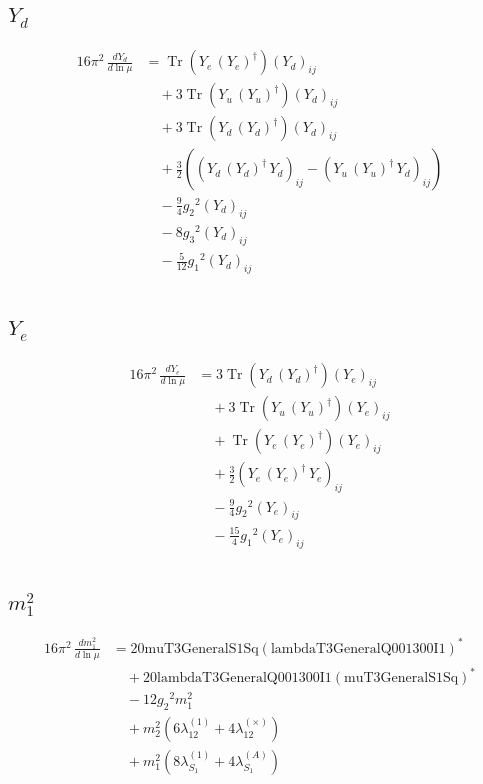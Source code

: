 \documentclass[10pt,a4paper]{article}
\begin{document}
\subsection*{$Y_d$}
\begin{align*}
16\pi^2\,\frac{d Y_d}{d\ln\mu} &=\operatorname{Tr}\!\left({Y_e}\,\left({Y_e}\right)^{\dagger}\right) \left({Y_d}\right)_{ij} \\
&\quad +3 \operatorname{Tr}\!\left({Y_u}\,\left({Y_u}\right)^{\dagger}\right) \left({Y_d}\right)_{ij} \\
&\quad +3 \operatorname{Tr}\!\left({Y_d}\,\left({Y_d}\right)^{\dagger}\right) \left({Y_d}\right)_{ij} \\
&\quad +\frac{3}{2} (\left({Y_d}\,\left({Y_d}\right)^{\dagger}\,{Y_d}\right)_{ij}-\left({Y_u}\,\left({Y_u}\right)^{\dagger}\,{Y_d}\right)_{ij}) \\
&\quad -\frac{9}{4} {g_2}^2 \left({Y_d}\right)_{ij} \\
&\quad -8 {g_3}^2 \left({Y_d}\right)_{ij} \\
&\quad -\frac{5}{12} {g_1}^2 \left({Y_d}\right)_{ij} \\
\end{align*}
\subsection*{$Y_e$}
\begin{align*}
16\pi^2\,\frac{d Y_e}{d\ln\mu} &=3 \operatorname{Tr}\!\left({Y_d}\,\left({Y_d}\right)^{\dagger}\right) \left({Y_e}\right)_{ij} \\
&\quad +3 \operatorname{Tr}\!\left({Y_u}\,\left({Y_u}\right)^{\dagger}\right) \left({Y_e}\right)_{ij} \\
&\quad +\operatorname{Tr}\!\left({Y_e}\,\left({Y_e}\right)^{\dagger}\right) \left({Y_e}\right)_{ij} \\
&\quad +\frac{3}{2} \left({Y_e}\,\left({Y_e}\right)^{\dagger}\,{Y_e}\right)_{ij} \\
&\quad -\frac{9}{4} {g_2}^2 \left({Y_e}\right)_{ij} \\
&\quad -\frac{15}{4} {g_1}^2 \left({Y_e}\right)_{ij} \\
\end{align*}
\subsection*{$m_1^2$}
\begin{align*}
16\pi^2\,\frac{d m_1^2}{d\ln\mu} &=20 \text{muT3GeneralS1Sq} \left(\text{lambdaT3GeneralQ001300I1}\right)^{*} \\
&\quad +20 \text{lambdaT3GeneralQ001300I1} \left(\text{muT3GeneralS1Sq}\right)^{*} \\
&\quad -12 {g_2}^2 {m_1^2} \\
&\quad +{m_2^2} (6 {\lambda_{12}^{(1)}}+4 {\lambda_{12}^{(\times)}}) \\
&\quad +{m_1^2} (8 {\lambda_{S_1}^{(1)}}+4 {\lambda_{S_1}^{(A)}}) \\
\end{align*}
\end{document}
